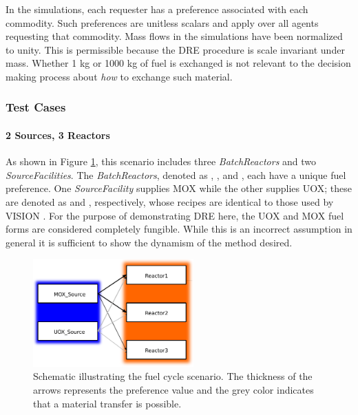 In the simulations, each requester has a preference associated with each
commodity. Such preferences are unitless scalars and apply over all agents
requesting that commodity. Mass flows in the simulations have been normalized to
unity. This is permissible because the DRE procedure is scale invariant under
mass. Whether 1 kg or 1000 kg of fuel is exchanged is not relevant to the
decision making process about \emph{how} to exchange such material.

\subsubsection{Test Cases}

\paragraph{2 Sources, 3 Reactors}

As shown in Figure \ref{fig::fc1}, this scenario includes
three \textit{BatchReactors} and
two \textit{SourceFacilities}. The \textit{BatchReactors}, denoted
as , , and , each have a unique fuel
preference. One \textit{SourceFacility} supplies MOX while the other supplies
UOX; these are denoted as \MOXSource{} and \UOXSource{}, respectively, whose
recipes are identical to those used by
VISION \cite{jacobson_verifiable_2010}. For the purpose of demonstrating DRE
here, the UOX and MOX fuel forms are considered completely fungible. While this
is an incorrect assumption in general it is sufficient to show the dynamism of
the method desired.

\begin{figure}
  \begin{center}
    \includegraphics[width=0.55\textwidth]{./figs/fc1.pdf}
    \caption[]{\label{fig::fc1}
        Schematic illustrating the fuel cycle scenario. The thickness of the
        arrows represents the preference value and the grey color indicates that
        a material transfer is possible.}
  \end{center}
\end{figure}

